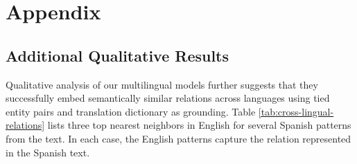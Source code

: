 \section{Appendix}

\subsection{Additional Qualitative Results \label{sec:more-qual-anal}}

Qualitative analysis of our multilingual models further suggests that they successfully embed semantically similar relations across languages using tied entity pairs and translation dictionary as grounding. Table \ref{tab:cross-lingual-relations} lists three top nearest neighbors in English for several Spanish patterns from the text. In each case, the English patterns capture the relation represented in the Spanish text.

